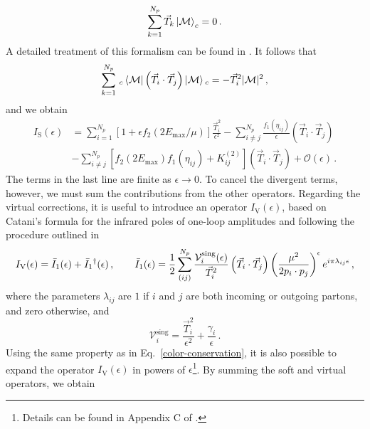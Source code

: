 \documentclass[a4paper, 12pt]{book}
\begin{document}
\begin{equation}
  \sum_{k=1}^{N_p} \vec{T}_k  \ket{\mathcal{M}}_c = 0 \, .
\end{equation}
A detailed treatment of this formalism can be found in \cite{Catani:1996vz}. It follows that 
\begin{equation}
  \sum_{k=1}^{N_p} \, {}_c \bra{\mathcal{M}} \left( \vec{T}_i \cdot \vec{T}_j\right) \ket{\mathcal{M}} {}_c= - \vec{T}^2_i |\mathcal{M}|^2 \, ,
  \label{color-conservation}
\end{equation}
and we obtain
\begin{equation}
  \begin{aligned}
  I_{\mathrm{S}}(\epsilon)  &= \sum_{i=1}^{N_p}  \left[1+\epsilon f_2(2E_{\mathrm{max}}/\mu)\right] \frac{\vec{T}_i^2}{\epsilon^2}- \sum_{i\neq j}^{N_p} \frac{f_1(\eta_{ij})}{\epsilon} \left( \vec{T}_i \cdot \vec{T}_j\right) \\
 & - \sum_{i\neq j}^{N_p} \left[ f_2 \left(2 E_{\mathrm{max}}\right) f_1(\eta_{ij}) + K_{ij}^{(2)}\right] (\vec{T}_i \cdot \vec{T}_j) + \mathcal{O}(\epsilon) \,.
  \end{aligned}
\end{equation}
The terms in the last line are finite as $\epsilon \to 0$. To cancel the divergent terms, however, we must sum the contributions from the other operators. Regarding the virtual corrections, it is useful to introduce an operator $I_{\mathrm{V}}(\epsilon)$, based on Catani's formula for the infrared poles of one-loop amplitudes \cite{Catani:1998bh} and following the procedure outlined in \cite{Devoto:2023rpv}
\begin{equation}
  I_{\mathrm{V}}(\epsilon) = \bar{I}_1 (\epsilon) + \bar{I}_1\textsuperscript{\textdagger} (\epsilon) \,, \qquad \bar{I}_1 (\epsilon)= \frac{1}{2} \sum_{(ij)}^{N_p} \frac{\mathcal{V}_i^{\mathrm{sing}}(\epsilon)}{\vec{T}_i^2} \left( \vec{T}_i \cdot \vec{T}_j\right) \left(\frac{\mu^2}{2p_i \cdot p_j}\right)^{\epsilon} e^{i \pi \lambda_{ij} \epsilon} \, ,
\end{equation}
where the parameters $\lambda_{ij}$ are $1$ if $i$ and $j$ are both incoming or outgoing partons, and zero otherwise, and 
\begin{equation}
  \mathcal{V}_i^{\mathrm{sing}}= \frac{\vec{T}_i^2}{\epsilon^2} + \frac{\gamma_i}{\epsilon} \,. 
\end{equation}
Using the same property as in Eq.~\ref{color-conservation}, it is also possible to expand the operator $I_{\mathrm{V}}(\epsilon)$ in powers of $\epsilon$\footnote{Details can be found in Appendix C of \cite{Devoto:2025kin}.}. By summing the soft and virtual operators, we obtain
\end{document}
